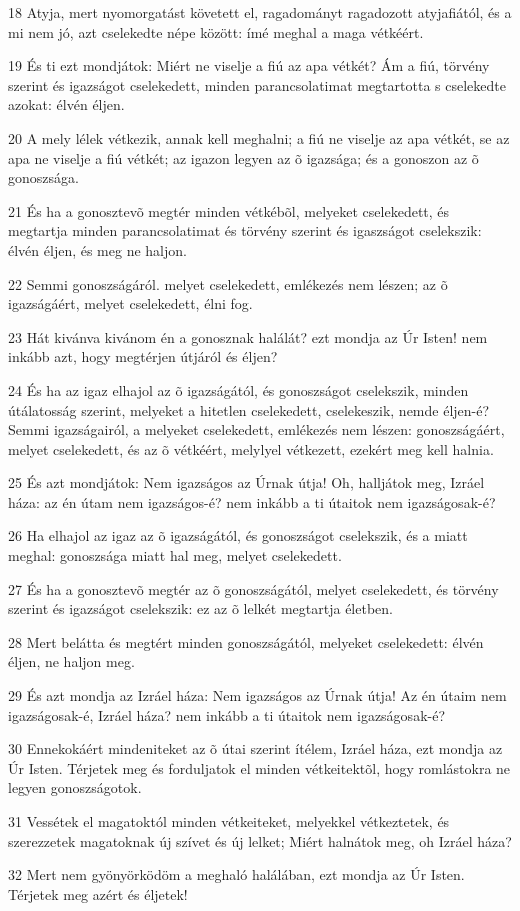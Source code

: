 \par 18 Atyja, mert nyomorgatást követett el, ragadományt ragadozott atyjafiától, és a mi nem jó, azt cselekedte népe között: ímé meghal a maga vétkéért.
\par 19 És ti ezt mondjátok: Miért ne viselje a fiú az apa vétkét? Ám a fiú, törvény szerint és igazságot cselekedett, minden parancsolatimat megtartotta s cselekedte azokat: élvén éljen.
\par 20 A mely lélek vétkezik, annak kell meghalni; a fiú ne viselje az apa vétkét, se az apa ne viselje a fiú vétkét; az igazon legyen az õ igazsága; és a gonoszon az õ gonoszsága.
\par 21 És ha a gonosztevõ megtér minden vétkébõl, melyeket cselekedett, és megtartja minden parancsolatimat és törvény szerint és igaszságot cselekszik: élvén éljen, és meg ne haljon.
\par 22 Semmi gonoszságáról. melyet cselekedett, emlékezés nem lészen; az õ igazságáért, melyet cselekedett, élni fog.
\par 23 Hát kivánva kivánom én a gonosznak halálát? ezt mondja az Úr Isten! nem inkább azt, hogy megtérjen útjáról és éljen?
\par 24 És ha az igaz elhajol az õ igazságától, és gonoszságot cselekszik, minden útálatosság szerint, melyeket a hitetlen cselekedett, cselekeszik, nemde éljen-é? Semmi igazságairól, a melyeket cselekedett, emlékezés nem lészen: gonoszságáért, melyet cselekedett, és az õ vétkéért, melylyel vétkezett, ezekért meg kell halnia.
\par 25 És azt mondjátok: Nem igazságos az Úrnak útja! Oh, halljátok meg, Izráel háza: az én útam nem igazságos-é? nem inkább a ti útaitok nem igazságosak-é?
\par 26 Ha elhajol az igaz az õ igazságától, és gonoszságot cselekszik, és a miatt meghal: gonoszsága miatt hal meg, melyet cselekedett.
\par 27 És ha a gonosztevõ megtér az õ gonoszságától, melyet cselekedett, és törvény szerint és igazságot cselekszik: ez az õ lelkét megtartja életben.
\par 28 Mert belátta és megtért minden gonoszságától, melyeket cselekedett: élvén éljen, ne haljon meg.
\par 29 És azt mondja az Izráel háza: Nem igazságos az Úrnak útja! Az én útaim nem igazságosak-é, Izráel háza? nem inkább a ti útaitok nem igazságosak-é?
\par 30 Ennekokáért mindeniteket az õ útai szerint ítélem, Izráel háza, ezt mondja az Úr Isten. Térjetek meg és forduljatok el minden vétkeitektõl, hogy romlástokra ne legyen gonoszságotok.
\par 31 Vessétek el magatoktól minden vétkeiteket, melyekkel vétkeztetek, és szerezzetek magatoknak új szívet és új lelket; Miért halnátok meg, oh Izráel háza?
\par 32 Mert nem gyönyörködöm a meghaló halálában, ezt mondja az Úr Isten. Térjetek meg azért és éljetek!

